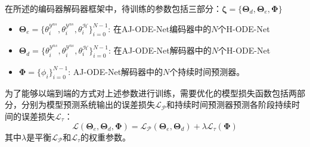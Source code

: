 在所述的编码器解码器框架中，待训练的参数包括三部分：$\boldsymbol \zeta=\{\boldsymbol{\Theta}_d, \boldsymbol{\Theta}_e,\boldsymbol{\Phi}\}$
\begin{itemize}
    \item $\boldsymbol{\Theta}_e=\{\theta_i^{\mathcal{Y}^{ns}},\theta_i^{\mathcal{Y}^{ns}},\theta_i^{\mathcal{H}}\}_{i=0}^{N-1}$: 在AJ-ODE-Net编码器中的$N$个H-ODE-Net 
    \item $\boldsymbol{\Theta}_d=\{\theta_i^{\mathcal{Y}^{ns}},\theta_i^{\mathcal{Y}^{ns}},\theta_i^{\mathcal{H}}\}_{i=0}^{N-1}$: 在AJ-ODE-Net解码器中的$N$个H-ODE-Net 
    \item $\boldsymbol{\Phi}=\{\phi_i\}_{i=0}^{N-1}$:  AJ-ODE-Net解码器中的$N$个持续时间预测器。
\end{itemize}
为了能够以端到端的方式对上述参数进行训练，需要优化的模型损失函数包括两部分，分别为模型预测系统输出的误差损失$\mathcal{L_P}$和持续时间预测器预测各阶段持续时间的误差损失$\mathcal{L}_{\tau}$：
\begin{equation}
\mathcal{L}(\boldsymbol{\Theta}_e, \boldsymbol{\Theta}_d, \boldsymbol \Phi) = \mathcal{L_P}(\boldsymbol{\Theta}_e, \boldsymbol{\Theta}_d) + \lambda\mathcal{L}_{\tau}(\boldsymbol \Phi)
\end{equation}
其中$\lambda$是平衡$\mathcal{L_P}$和$\mathcal{L}_{\tau}$的权重参数。

